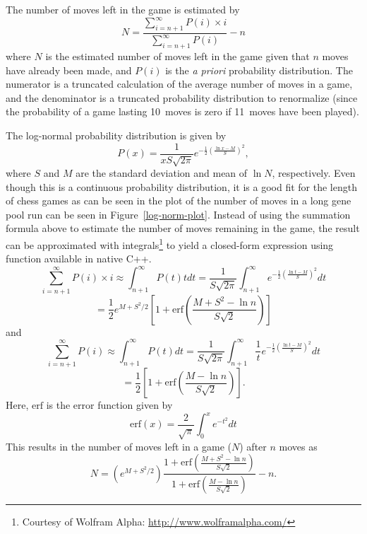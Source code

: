 \documentclass[letterpaper]{article}
\newcommand{\cpp}{C{\nobreak +}{\nobreak +}}
\renewcommand\_{\textunderscore\allowbreak}
\begin{document}
The number of moves left in the game is estimated by
\[N = \frac{\sum_{i = n + 1}^\infty P(i)\times{}i}{\sum_{i = n + 1}^\infty P(i)} - n\]
where \(N\) is the estimated number of moves left in the game given that \(n\) moves have already been made, and \(P(i)\) is the \emph{a priori} probability distribution. The numerator is a truncated calculation of the average number of moves in a game, and the denominator is a truncated probability distribution to renormalize (since the probability of a game lasting 10~moves is zero if 11~moves have been played).

The log-normal probability distribution is given by
\[P(x) = \frac{1}{xS\sqrt{2\pi}} e^{-\frac{1}{2}\left(\frac{\ln{x} - M}{S}\right)^2},\]
where \(S\) and \(M\) are the standard deviation and mean of \(\ln{N}\), respectively. Even though this is a continuous probability distribution, it is a good fit for the length of chess games as can be seen in the plot of the number of moves in a long gene pool run can be seen in Figure~\ref{log-norm-plot}. Instead of using the summation formula above to estimate the number of moves remaining in the game, the result can be approximated with integrals\footnote{Courtesy of Wolfram Alpha: \url{http://www.wolframalpha.com/}} to yield a closed-form expression using function available in native \cpp.
\[
\sum_{i = n + 1}^\infty P(i)\times{}i \approx \int_{n+1}^\infty P(t)tdt = \frac{1}{S\sqrt{2\pi}} \int_{n+1}^\infty e^{-\frac{1}{2}\left(\frac{\ln{t} - M}{S}\right)^2}dt
\]
\[
= \frac{1}{2}e^{M + S^2/2}\left[1 + \textrm{erf}\left(\frac{M + S^2 - \ln n}{S\sqrt{2}}\right)\right]
\]
and
\[
\sum_{i = n + 1}^\infty P(i) \approx \int_{n+1}^\infty P(t)dt = \frac{1}{S\sqrt{2\pi}} \int_{n+1}^\infty \frac{1}{t} e^{-\frac{1}{2}\left(\frac{\ln{t} - M}{S}\right)^2}dt
\]
\[
= \frac{1}{2}\left[1 + \textrm{erf}\left(\frac{M-\ln n}{S\sqrt{2}}\right)\right].
\]
Here, \(\textrm{erf}\) is the error function given by
\[
\textrm{erf}(x) = \frac{2}{\sqrt{\pi}}\int_0^x e^{-t^2}dt
\]
This results in the number of moves left in a game (\(N\)) after \(n\) moves as
\[
N = \left(e^{M + S^2/2}\right) \frac
{1 + \textrm{erf}\left(\frac{M + S^2 - \ln n}{S\sqrt{2}}\right)}
{1 + \textrm{erf}\left(\frac{M-\ln n}{S\sqrt{2}}\right)}
- n.
\]
\end{document}

